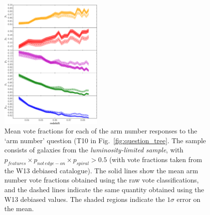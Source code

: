 \documentclass[useAMS,usenatbib]{mn2e}
\begin{document}
\begin{figure}
		\centering

        \includegraphics[width=0.45\textwidth]{Images/Bias/Biases/mean_arm_fractions.pdf}

        \caption{Mean vote fractions for each of the arm number responses to the `arm number' question (T10 in Fig.~\ref{fig:question_tree}. The sample consists of galaxies from the \textit{luminosity-limited sample}, with $p_{features} \times p_{not \, edge-on} \times p_{spiral} > 0.5$ (with vote fractions taken from the W13 debiased catalogue). The solid lines show the mean arm number vote fractions obtained using the raw vote classifications, and the dashed lines indicate the same quantity obtained using the W13 debiased values. The shaded regions indicate the $1 \sigma$ error on the mean.}

        \label{fig:arm_bias}

\end{figure}
\end{document}
